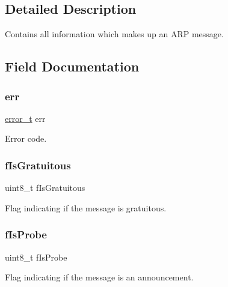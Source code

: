 \subsection{Detailed Description}
Contains all information which makes up an A\+RP message. 

\subsection{Field Documentation}
\mbox{\label{struct_a_r_p__message__t_a79e8f977787d9fccf257bbbccaaf3522}} 
\subsubsection{\texorpdfstring{err}{err}}
{\footnotesize\ttfamily \mbox{\hyperlink{structerror__t}{error\+\_\+t}} err}



Error code. 

\mbox{\label{struct_a_r_p__message__t_a10f6f518105e71039413d95c27db5a5d}} 
\subsubsection{\texorpdfstring{fIsGratuitous}{fIsGratuitous}}
{\footnotesize\ttfamily uint8\+\_\+t f\+Is\+Gratuitous}



Flag indicating if the message is gratuitous. 

\mbox{\label{struct_a_r_p__message__t_ad84934498bc8cb014f7ccfd3df0eaaab}} 
\subsubsection{\texorpdfstring{fIsProbe}{fIsProbe}}
{\footnotesize\ttfamily uint8\+\_\+t f\+Is\+Probe}



Flag indicating if the message is an announcement. 

